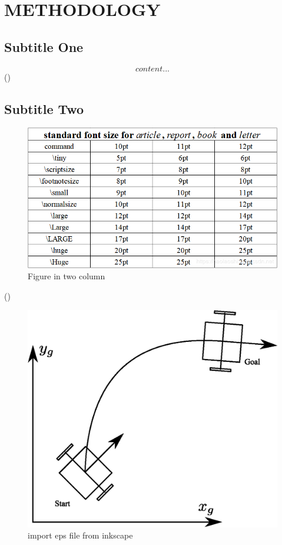 \documentclass[10pt,letterpaper,twocolumn]{article}
\begin{document}
\section{METHODOLOGY}
\subsection{Subtitle One}
\begin{equation}
		content...
\end{equation}
(\cite{zidani2015backstepping})
\subsection{Subtitle Two}

\begin{figure}
	\centering
	\includegraphics[width=\linewidth]{font.png}
	\caption{Figure in two column}
\end{figure}
(\cite{duchovn2014path})

\begin{figure}
	\centering
	\includegraphics[width=0.7\linewidth]{ddtest.eps}
	\caption{import eps file from inkscape}
\end{figure}
\end{document}

